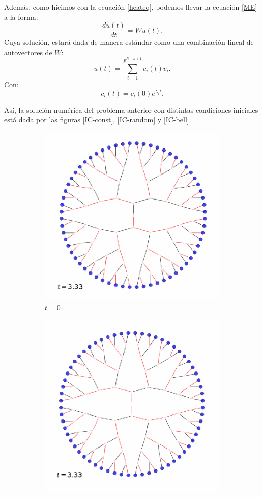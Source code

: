 Además, como hicimos con la ecuación \ref{heateq}, podemos llevar la ecuación \ref{ME} a la forma:
$$\frac{du(t)}{dt} = Wu(t).$$
Cuya solución, estará dada de manera estándar como una combinación lineal de autovectores de $W$:
$$u(t)=\sum_{i=1}^{p^{N-n+1}}c_i(t)v_i.$$
Con:
$$c_i(t)=c_i(0)e^{\lambda_it}.$$

Así, la solución numérica del problema anterior con distintas condiciones iniciales está dada por las figuras \ref{IC-const}, \ref{IC-random} y \ref{IC-bell}.               

\begin{figure}
	\begin{subfigure}{.5\textwidth}
		\centering
		\includegraphics[width=.8\linewidth]{img/solutions/ones_0}
		\caption{$t=0$}
		\label{fig:sfig1}
	\end{subfigure}%
	\begin{subfigure}{.5\textwidth}
		\centering
		\includegraphics[width=.8\linewidth]{img/solutions/ones_1}

\end{subfigure}
\end{figure}

